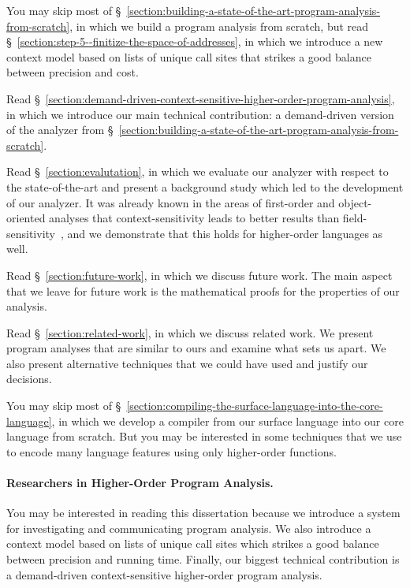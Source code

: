 \documentclass[12pt, oneside]{book}
\begin{document}
You may skip most of §~\ref{section:building-a-state-of-the-art-program-analysis-from-scratch}, in which we build a program analysis from scratch, but read §~\ref{section:step-5--finitize-the-space-of-addresses}, in which we introduce a new context model based on lists of unique call sites that strikes a good balance between precision and cost.

Read §~\ref{section:demand-driven-context-sensitive-higher-order-program-analysis}, in which we introduce our main technical contribution: a demand-driven version of the analyzer from §~\ref{section:building-a-state-of-the-art-program-analysis-from-scratch}.

Read §~\ref{section:evalutation}, in which we evaluate our analyzer with respect to the state-of-the-art and present a background study which led to the development of our analyzer. It was already known in the areas of first-order and object-oriented analyses that context-sensitivity leads to better results than field-sensitivity~\cite{lcl}, and we demonstrate that this holds for higher-order languages as well.

Read §~\ref{section:future-work}, in which we discuss future work. The main aspect that we leave for future work is the mathematical proofs for the properties of our analysis.

Read §~\ref{section:related-work}, in which we discuss related work. We present program analyses that are similar to ours and examine what sets us apart. We also present alternative techniques that we could have used and justify our decisions.

You may skip most of §~\ref{section:compiling-the-surface-language-into-the-core-language}, in which we develop a compiler from our surface language into our core language from scratch. But you may be interested in some techniques that we use to encode many language features using only higher-order functions.

\paragraph{Researchers in Higher-Order Program Analysis.}

You may be interested in reading this dissertation because we introduce a system for investigating and communicating program analysis. We also introduce a context model based on lists of unique call sites which strikes a good balance between precision and running time. Finally, our biggest technical contribution is a demand-driven context-sensitive higher-order program analysis.
\end{document}
